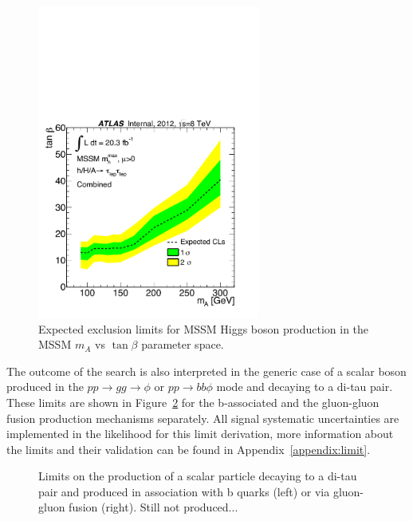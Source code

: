 \begin{figure}[t]
  \centering
  \includegraphics[width=0.65\textwidth]{figure/limits/Limits_mAtanBeta_Comb.pdf}
  \caption{Expected %
  exclusion limits for MSSM Higgs boson production 
in the MSSM $m_A$ vs $\tan\beta$ parameter space.}
\label{fig:limit_extract_combined}
\end{figure}


The outcome of the search is also interpreted in the generic case of a scalar boson produced in the
$pp \rightarrow gg \rightarrow \phi$ or $pp \rightarrow bb\phi$ mode and decaying to a di-tau pair.
These limits are shown in Figure~\ref{fig:limit_xs} 
for the b-associated  and the gluon-gluon fusion production mechanisms separately.
All signal systematic uncertainties are implemented in the likelihood
for this limit derivation, more information about the limits and their validation can be found in Appendix~\ref{appendix:limit}.

\begin{figure}[t]
  \centering
  \caption{ Limits on the production of a scalar particle decaying to a di-tau pair
    and produced     in association with b quarks (left) or   via gluon-gluon fusion (right). Still not produced...}
\label{fig:limit_xs}
\end{figure}

